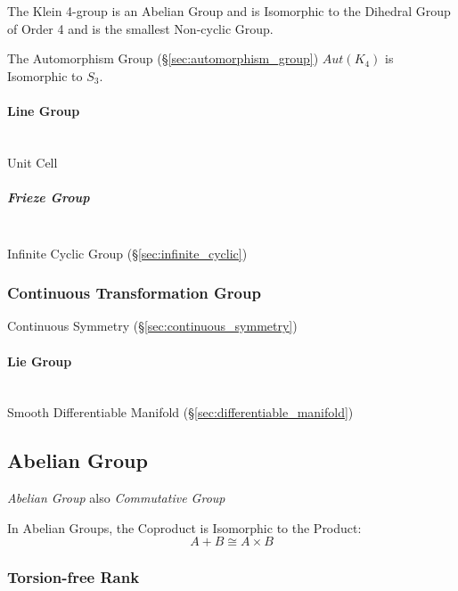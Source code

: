 The Klein 4-group is an Abelian Group and is Isomorphic to the
Dihedral Group of Order 4 and is the smallest Non-cyclic Group.

The Automorphism Group (\S\ref{sec:automorphism_group}) $Aut(K_4)$ is
Isomorphic to $S_3$.



\paragraph{Line Group}\label{sec:line_group}
\hfill \\

Unit Cell



\subparagraph{Frieze Group}\label{sec:frieze_group}
\hfill \\

Infinite Cyclic Group (\S\ref{sec:infinite_cyclic})



\subsubsection{Continuous Transformation Group}
\label{sec:continuous_transformation_group}

Continuous Symmetry (\S\ref{sec:continuous_symmetry})



\paragraph{Lie Group}\label{sec:lie_group}
\hfill \\

Smooth Differentiable Manifold (\S\ref{sec:differentiable_manifold})



\subsection{Abelian Group}\label{sec:abelian_group}

\emph{Abelian Group} also \emph{Commutative Group}

In Abelian Groups, the Coproduct is Isomorphic to the Product:
\[
  A + B \cong A \times B
\]



\subsubsection{Torsion-free Rank}\label{sec:torsionfree_rank}

